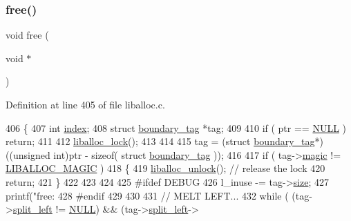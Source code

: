 \subsubsection{\texorpdfstring{free()}{free()}}
{\footnotesize\ttfamily void free (\begin{DoxyParamCaption}\item[{void $\ast$}]{ }\end{DoxyParamCaption})}



Definition at line 405 of file liballoc.\+c.


\begin{DoxyCode}
406 \{
407     \textcolor{keywordtype}{int} \hyperlink{a00095_adfc426eed5361508d62c6e8f484bd270_adfc426eed5361508d62c6e8f484bd270}{index};
408     \textcolor{keyword}{struct }\hyperlink{a00095}{boundary\_tag} *tag;
409 
410     \textcolor{keywordflow}{if} ( ptr == \hyperlink{a00026_a070d2ce7b6bb7e5c05602aa8c308d0c4_a070d2ce7b6bb7e5c05602aa8c308d0c4}{NULL} ) \textcolor{keywordflow}{return};
411 
412     \hyperlink{a00026_a8b5670e4594b0b6f8be78fe17f0c3b53_a8b5670e4594b0b6f8be78fe17f0c3b53}{liballoc\_lock}();
413     
414 
415         tag = (\textcolor{keyword}{struct }\hyperlink{a00095}{boundary\_tag}*)((\textcolor{keywordtype}{unsigned} \textcolor{keywordtype}{int})ptr - \textcolor{keyword}{sizeof}( \textcolor{keyword}{struct }
      \hyperlink{a00095}{boundary\_tag} ));
416     
417         \textcolor{keywordflow}{if} ( tag->\hyperlink{a00095_a96a8bec3c60c81b8c41239169ec70b6c_a96a8bec3c60c81b8c41239169ec70b6c}{magic} != \hyperlink{a00023_af6b1d459ffa3c81e2456acf8d4268330_af6b1d459ffa3c81e2456acf8d4268330}{LIBALLOC\_MAGIC} ) 
418         \{
419             \hyperlink{a00026_aedc23f198b2882d41d0caa316453967b_aedc23f198b2882d41d0caa316453967b}{liballoc\_unlock}();       \textcolor{comment}{// release the lock}
420             \textcolor{keywordflow}{return};
421         \}
422 
423 
424 
425 \textcolor{preprocessor}{        #ifdef DEBUG}
426         l\_inuse -= tag->\hyperlink{a00095_a29b056a39f6022d32468e7913e6df936_a29b056a39f6022d32468e7913e6df936}{size};
427         printf(\textcolor{stringliteral}{"free: %
428 \textcolor{preprocessor}{        #endif}
429         
430 
431         \textcolor{comment}{// MELT LEFT...}
432         \textcolor{keywordflow}{while} ( (tag->\hyperlink{a00095_a4daa8c3768359ea8d0f46ef907616cc2_a4daa8c3768359ea8d0f46ef907616cc2}{split\_left} != \hyperlink{a00026_a070d2ce7b6bb7e5c05602aa8c308d0c4_a070d2ce7b6bb7e5c05602aa8c308d0c4}{NULL}) && (tag->\hyperlink{a00095_a4daa8c3768359ea8d0f46ef907616cc2_a4daa8c3768359ea8d0f46ef907616cc2}{split\_left}->
}
\end{DoxyCode}
